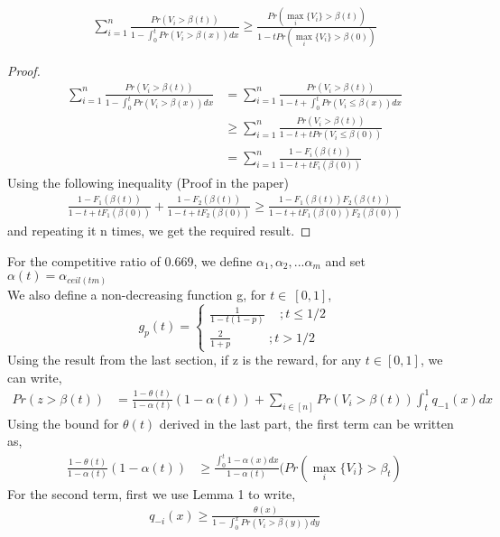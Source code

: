 \documentclass[12pt, letterpaper, twoside]{article}
\begin{document}
\begin{align*}
\sum_{i=1}^{n} \frac{Pr(V_{i}>\beta(t))}{1-\int_{0}^{t} Pr(V_{i}>\beta(x)) dx} \geq \frac{Pr(\max_{i} \{V_{i}\} > \beta(t))}{1-tPr(\max_{i} \{V_{i}\} > \beta(0))}
\end{align*}
\begin{proof}
\begin{align*}
\sum_{i=1}^{n} \frac{Pr(V_{i}>\beta(t))}{1-\int_{0}^{t} Pr(V_{i}>\beta(x)) dx} &= \sum_{i=1}^{n} \frac{Pr(V_{i}>\beta(t))}{1-t+\int_{0}^{t} Pr(V_{i}\leq\beta(x)) dx}\\
&\geq \sum_{i=1}^{n} \frac{Pr(V_{i}>\beta(t))}{1-t+tPr(V_{i}\leq\beta(0))}\\
&=\sum_{i=1}^{n} \frac{1-F_{i}(\beta(t))}{1-t+tF_{i}(\beta(0))}
\end{align*}
Using the following inequality	 (Proof in the paper)
\begin{align*} 
\frac{1-F_{1}(\beta(t))}{1-t+tF_{1}(\beta(0))} + \frac{1-F_{2}(\beta(t))}{1-t+tF_{2}(\beta(0))} \geq \frac{1-F_{1}(\beta(t))F_{2}(\beta(t))}{1-t+tF_{1}(\beta(0))F_{2}(\beta(0))} 
\end{align*}  
and repeating it n times, we get the required result.
\end{proof}
For the competitive ratio of 0.669, we define $\alpha_{1}, \alpha_{2},...\alpha_{m}$ and set $\alpha(t) = \alpha_{ceil(tm)}$\\
We also define a non-decreasing function g, for $t \in\ [0,1]$,
$$g_{p}(t) = \begin{cases}
\frac{1}{1-t(1-p)}  \quad \,; t \leq 1/2 \\
\frac{2}{1+p} \quad \quad \quad; t > 1/2
\end{cases}
$$
Using the result from the last section, if z is the reward, for any $t \in [0,1]$, we can write,\\
\begin{align*}
Pr(z > \beta(t)) &= \frac{1-\theta(t)}{1-\alpha(t)} (1-\alpha(t)) + \sum_{i \in [n]} Pr(V_{i} > \beta(t)) \int_{t}^{1} q_{-1}(x) dx
\end{align*}
Using the bound for $\theta(t)$ derived in the last part, the first term can be written as,
\begin{align*}
 \frac{1-\theta(t)}{1-\alpha(t)} (1-\alpha(t)) &\geq \frac{\int_{0}^{t} 1 - \alpha(x) dx}{1-\alpha(t)} (Pr(\max_{i} \{V_{i}\} > \beta_{t})
\end{align*}
For the second term, first we use Lemma 1 to write,
\begin{align*}
q_{-i}(x) \geq \frac{\theta(x)}{1-\int_{0}^{x} Pr(V_{i} > \beta(y))  dy}
\end{align*}
\end{document}
